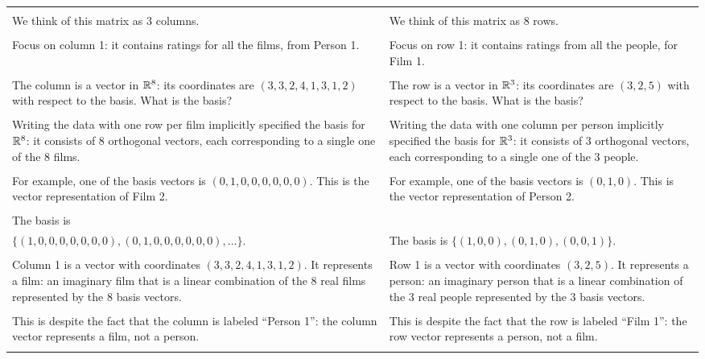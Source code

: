 \begin{lemma}
{\begin{tabular}{|p{8cm}|p{8 cm}|}
  \hline
  &\\
  We think of this matrix as 3 columns.
  &We think of this matrix as 8 rows.\\
  &\\

  Focus on column 1: it contains ratings for all the films, from Person 1.
  &Focus on row 1: it contains ratings from all the people, for Film 1.\\
  &\\

  The column is a vector in $\mathbb{R}^8$: its coordinates are $(3,3,2,4,1,3,1,2)$ with respect to the basis. What is the
  basis?
  &The row is a vector in $\mathbb{R}^3$: its coordinates are $(3, 2, 5)$ with respect to the basis. What is the
    basis?\\
  &\\

  Writing the data with one row per film implicitly specified the basis for $\mathbb{R}^8$:
  it consists of 8 orthogonal vectors, each corresponding to a single one of the 8 films.
  &Writing the data with one column per person implicitly specified the basis for $\mathbb{R}^3$:
    it consists of 3 orthogonal vectors, each corresponding to a single one of the 3 people.\\
  &\\

  For example, one of the basis vectors is $(0, 1, 0, 0, 0, 0, 0, 0)$. This is the
  vector representation of Film 2.
  &For example, one of the basis vectors is $(0, 1, 0)$. This is the vector
    representation of Person 2.\\
  &\\

  The basis is\\ $\{(1, 0, 0, 0, 0, 0, 0, 0), (0, 1, 0, 0, 0, 0, 0, 0), \ldots\}$.
  &The basis is $\{(1, 0, 0), (0, 1, 0), (0, 0, 1)\}$.\\
  &\\

  Column 1 is a vector with coordinates $(3,3,2,4,1,3,1,2)$.
  It represents a film: an imaginary film that is a linear combination of the 8 real
  films represented by the 8 basis vectors.
  &Row 1 is a vector with coordinates $(3, 2, 5)$.
    It represents a person: an imaginary person that is a linear combination of the 3 real
    people represented by the 3 basis vectors.\\
  &\\

  This is despite the fact that the column is labeled ``Person 1'': the column vector represents a film, not a person.
  &This is despite the fact that the row is labeled ``Film 1'': the row vector represents a person, not a film.\\
  &\\


\end{tabular}}
\end{lemma}
